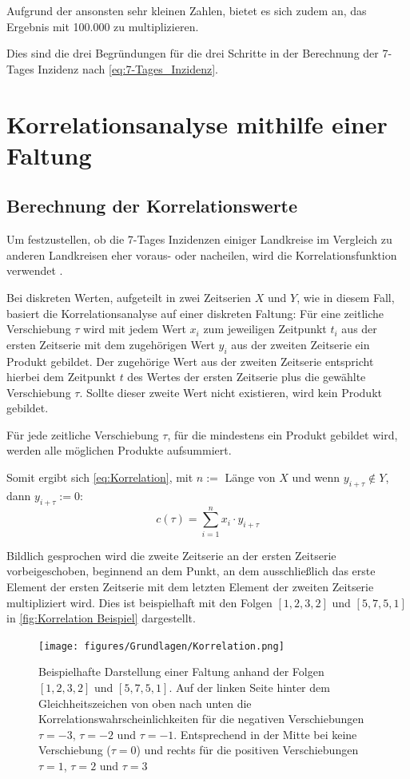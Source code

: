 Aufgrund der ansonsten sehr kleinen Zahlen, bietet es sich zudem an, das Ergebnis mit 100.000 zu multiplizieren.

Dies sind die drei Begründungen für die drei Schritte in der Berechnung der 7-Tages Inzidenz nach \autoref{eq:7-Tages_Inzidenz}.


\section{Korrelationsanalyse mithilfe einer Faltung}\label{sec:BeschreibungKorrelationsanalyse}
\subsection{Berechnung der Korrelationswerte}\label{Grundlagen:Berechnung der Korrelationwerte}
Um festzustellen, ob die 7-Tages Inzidenzen einiger Landkreise im Vergleich zu anderen Landkreisen eher voraus- oder nacheilen, wird die Korrelationsfunktion verwendet \autocite{Korrelation}.

Bei diskreten Werten, aufgeteilt in zwei Zeitserien $X$ und $Y$, wie in diesem Fall, basiert die Korrelationsanalyse auf einer diskreten Faltung:
Für eine zeitliche Verschiebung $\tau$ wird mit jedem Wert $x_i$ zum jeweiligen Zeitpunkt $t_i$ aus der ersten Zeitserie mit dem zugehörigen Wert $y_i$ aus der zweiten Zeitserie ein Produkt gebildet. Der zugehörige Wert aus der zweiten Zeitserie entspricht hierbei dem Zeitpunkt $t$ des Wertes der ersten Zeitserie plus die gewählte Verschiebung $\tau$. Sollte dieser zweite Wert nicht existieren, wird kein Produkt gebildet.

Für jede zeitliche Verschiebung $\tau$, für die mindestens ein Produkt gebildet wird, werden alle möglichen Produkte aufsummiert.

Somit ergibt sich \autoref{eq:Korrelation}, mit $n := $ Länge von $X$ und wenn $y_{i+\tau} \not\in Y$, dann $y_{i+\tau} := 0$:
\begin{equation}\label{eq:Korrelation}
    c(\tau) = \sum_{i=1}^n x_i\cdot y_{i+\tau}
\end{equation}


Bildlich gesprochen wird die zweite Zeitserie an der ersten Zeitserie vorbeigeschoben, beginnend an dem Punkt, an dem ausschließlich das erste Element der ersten Zeitserie mit dem letzten Element der zweiten Zeitserie multipliziert wird. Dies ist beispielhaft mit den Folgen $[1,2,3,2]$ und $[5,7,5,1]$ in \autoref{fig:Korrelation Beispiel} dargestellt.

\begin{figure}[H]
    \centering
    \texttt{[image: figures/Grundlagen/Korrelation.png]}
    \caption{Beispielhafte Darstellung einer Faltung anhand der Folgen $[1,2,3,2]$ und $[5,7,5,1]$. Auf der linken Seite hinter dem Gleichheitszeichen von oben nach unten die Korrelationswahrscheinlichkeiten für die negativen Verschiebungen $\tau=-3$, $\tau=-2$ und $\tau=-1$. Entsprechend in der Mitte bei keine Verschiebung ($\tau=0$) und rechts für die positiven Verschiebungen $\tau=1$, $\tau=2$ und $\tau=3$}
    \label{fig:Korrelation Beispiel}
\end{figure}

